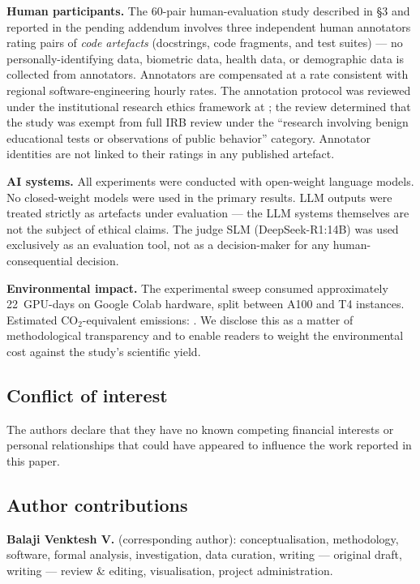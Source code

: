 \textbf{Human participants.} The 60-pair human-evaluation study described in §3 and reported in the pending addendum involves three independent human annotators rating pairs of \emph{code artefacts} (docstrings, code fragments, and test suites) --- no personally-identifying data, biometric data, health data, or demographic data is collected from annotators. Annotators are compensated at a rate consistent with regional software-engineering hourly rates. The annotation protocol was reviewed under the institutional research ethics framework at ; the review determined that the study was exempt from full IRB review under the ``research involving benign educational tests or observations of public behavior'' category. Annotator identities are not linked to their ratings in any published artefact.

\textbf{AI systems.} All experiments were conducted with open-weight language models. No closed-weight models were used in the primary results. LLM outputs were treated strictly as artefacts under evaluation --- the LLM systems themselves are not the subject of ethical claims. The judge SLM (DeepSeek-R1:14B) was used exclusively as an evaluation tool, not as a decision-maker for any human-consequential decision.

\textbf{Environmental impact.} The experimental sweep consumed approximately 22~GPU-days on Google Colab hardware, split between A100 and T4 instances. Estimated CO$_2$-equivalent emissions: . We disclose this as a matter of methodological transparency and to enable readers to weight the environmental cost against the study's scientific yield.

\subsection{Conflict of interest}

The authors declare that they have no known competing financial interests or personal relationships that could have appeared to influence the work reported in this paper.

\subsection{Author contributions}

\textbf{Balaji Venktesh V.} (corresponding author): conceptualisation, methodology, software, formal analysis, investigation, data curation, writing --- original draft, writing --- review \& editing, visualisation, project administration.

